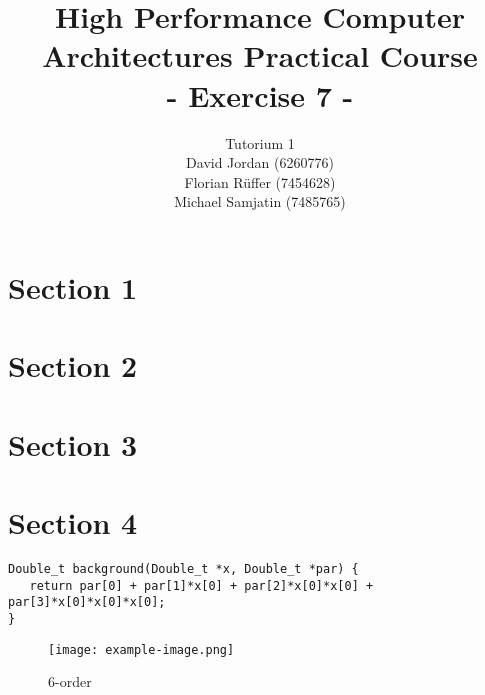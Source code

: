 \documentclass{article}
\title{\textbf{High Performance Computer Architectures Practical Course \\ - Exercise 7 -} \\[10mm]}
\author{Tutorium 1 \\[10mm] David Jordan (6260776) \\[1mm] Florian Rüffer (7454628) \\[1mm] Michael Samjatin (7485765) \\[10mm]}
\begin{document}
\maketitle
\newpage
\section*{Section 1}
\section*{Section 2}
\section*{Section 3}
\section*{Section 4}

\begin{lstlisting}[caption=Order 3]
    Double_t background(Double_t *x, Double_t *par) {
   return par[0] + par[1]*x[0] + par[2]*x[0]*x[0] + par[3]*x[0]*x[0]*x[0];
}

\end{lstlisting}

\begin{figure}[H]
    \centering
    \texttt{[image: example-image.png]} 
    \caption{6-order}
    \label{fig:graph}
\end{figure}

  
\end{document}
